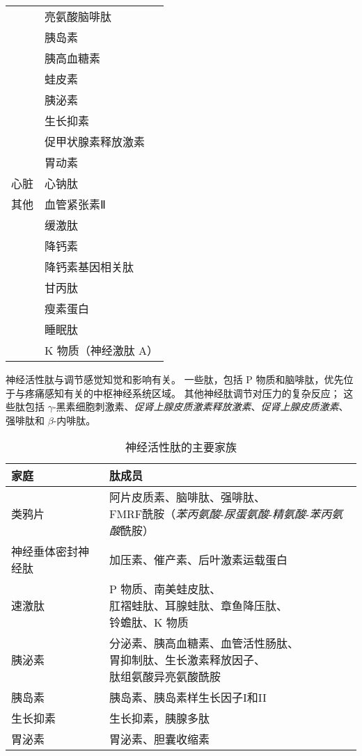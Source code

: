 \begin{table}[htbp]
\begin{tabular}{ll}
		 & 亮氨酸脑啡肽   \\
		 & 胰岛素   \\
		 & 胰高血糖素   \\
		 & 蛙皮素   \\
		 & 胰泌素   \\
		 & 生长抑素   \\
		 & 促甲状腺素释放激素   \\
		 & 胃动素   \\
		心脏 & 心钠肽   \\
		其他 & 血管紧张素Ⅱ   \\
		 & 缓激肽   \\
		 & 降钙素   \\
		 & 降钙素基因相关肽   \\
		 & 甘丙肽   \\
		 & 瘦素蛋白   \\
		 & 睡眠肽   \\
		 & K 物质（神经激肽 A）   \\
		\bottomrule
	\end{tabular}
\end{table}


神经活性肽与调节感觉知觉和影响有关。
一些肽，包括 P 物质和脑啡肽，优先位于与疼痛感知有关的中枢神经系统区域。
其他神经肽调节对压力的复杂反应；
这些肽包括 $\gamma$-黑素细胞刺激素、\textit{促肾上腺皮质激素释放激素}、\textit{促肾上腺皮质激素}、强啡肽和 $\beta$-内啡肽。


\begin{table}[htbp]
	\caption{神经活性肽的主要家族} \label{tab:16_3} \centering
	\begin{tabular}{ll}
		\toprule
		家庭 & 肽成员 \\
		\midrule
		类鸦片 & \makecell[l]{阿片皮质素、脑啡肽、强啡肽、\\FMRF酰胺（\textit{苯丙氨酸}-\textit{尿蛋氨酸}-\textit{精氨酸}-\textit{苯丙氨酸}酰胺）}  \\
		神经垂体密封神经肽 & 加压素、催产素、后叶激素运载蛋白  \\
		速激肽 & \makecell[l]{P 物质、南美蛙皮肽、\\肛褶蛙肽、耳腺蛙肽、章鱼降压肽、\\铃蟾肽、K 物质}  \\
		胰泌素 & \makecell[l]{分泌素、胰高血糖素、血管活性肠肽、\\胃抑制肽、生长激素释放因子、\\肽组氨酸异亮氨酸酰胺}  \\
		胰岛素 & 胰岛素、胰岛素样生长因子I和II  \\
		生长抑素 & 生长抑素，胰腺多肽  \\
		胃泌素 & 胃泌素、胆囊收缩素  \\
		\bottomrule
	\end{tabular}
\end{table}


